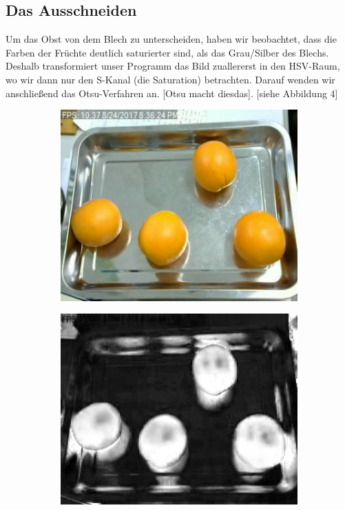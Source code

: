 \documentclass[a4,german]{article}
\begin{document}
\subsection{Das Ausschneiden}
Um das Obst von dem Blech zu unterscheiden, haben wir beobachtet, dass die Farben der Früchte deutlich saturierter sind, als das Grau/Silber des Blechs. Deshalb transformiert unser Programm das Bild zuallererst in den HSV-Raum, wo wir dann nur den S-Kanal (die Saturation) betrachten. Darauf wenden wir anschließend das Otsu-Verfahren an. [Otsu macht diesdas].
[siehe Abbildung 4]

\begin{figure}[b] %
\begin{subfigure}[c]{0.245\textwidth}
\includegraphics[width=1\textwidth]{TestBild.png} 
\end{subfigure}
\begin{subfigure}[c]{0.245\textwidth}
\includegraphics[width=1\textwidth]{TestBildS.png}

\end{subfigure}
\end{figure}
\end{document}
